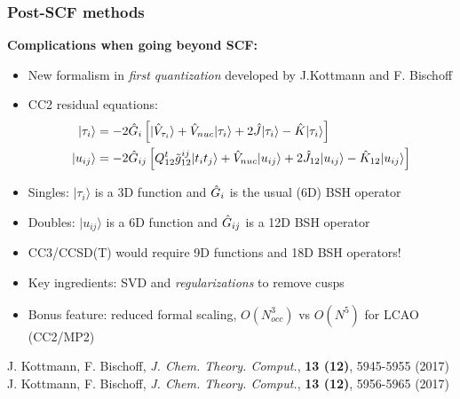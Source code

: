 \begin{frame}
  \frametitle{Post-SCF methods}

  \textbf{Complications when going beyond SCF:}

  \vspace{2mm}

  \begin{itemize}
    \item New formalism in \emph{first quantization} developed by J.Kottmann and F. Bischoff
    \item CC2 residual equations:
      \begin{align}
      |\tau_i \rangle &= -2\hat{G}_i\left[
                         |\hat{V}_{\tau_i}\rangle
                         + \hat{V}_{nuc} |\tau_i\rangle
                         + 2\hat{J} |\tau_i\rangle
                         - \hat{K}|\tau_i\rangle
                         \right]\\
      |u_{ij} \rangle &= -2\hat{G}_{ij}\left[
                         Q_{12}^t\tilde{g}_{12}^{ij} |t_it_j \rangle
                         + \hat{V}_{nuc} |u_{ij}\rangle
                         + 2\hat{J}_{12} |u_{ij}\rangle
                         - \hat{K}_{12}|u_{ij}\rangle
                         \right]
      \end{align}
    \item Singles: $|\tau_i\rangle$ is a 3D function and $\hat{G}_i$ is the usual (6D) BSH operator
    \item Doubles: $|u_{ij}\rangle$ is a 6D function and $\hat{G}_{ij}$ is a 12D BSH operator
    \item CC3/CCSD(T) would require 9D functions and 18D BSH operators!
    \item Key ingredients: SVD and \emph{regularizations} to remove cusps
    \item Bonus feature: reduced formal scaling, $O(N_{occ}^3)$ vs $O(N^5)$ for LCAO (CC2/MP2)
  \end{itemize}
  
  \vspace{5mm}
  \centering
  \tiny
  J. Kottmann, F. Bischoff,
  {\it J. Chem. Theory. Comput.},
  \textbf{13 (12)},
  5945-5955 (2017)\\
  J. Kottmann, F. Bischoff,
  {\it J. Chem. Theory. Comput.},
  \textbf{13 (12)},
  5956-5965 (2017)
\end{frame}
